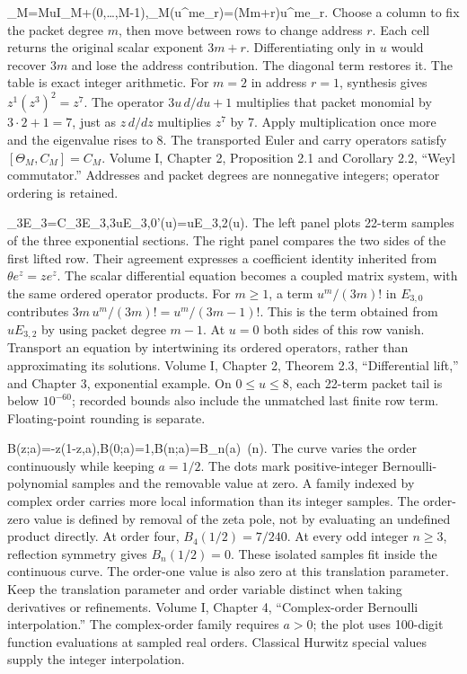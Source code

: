 {\Theta_M=MuI_M+(0,\ldots,M-1),\qquad \Theta_M(u^me_r)=(Mm+r)u^me_r.}
{Choose a column to fix the packet degree $m$, then move between rows to change address $r$. Each cell returns the original scalar exponent $3m+r$. Differentiating only in $u$ would recover $3m$ and lose the address contribution. The diagonal term restores it. The table is exact integer arithmetic.}
{For $m=2$ in address $r=1$, synthesis gives $z^1(z^3)^2=z^7$. The operator $3u\,d/du+1$ multiplies that packet monomial by $3\cdot2+1=7$, just as $z\,d/dz$ multiplies $z^7$ by 7. Apply multiplication once more and the eigenvalue rises to 8.}
{The transported Euler and carry operators satisfy $[\Theta_M,C_M]=C_M$.}
{Volume I, Chapter 2, Proposition 2.1 and Corollary 2.2, ``Weyl commutator.'' Addresses and packet degrees are nonnegative integers; operator ordering is retained.}

{\Theta_3\boldsymbol E_3=C_3\boldsymbol E_3,\qquad 3uE_{3,0}'(u)=uE_{3,2}(u).}
{The left panel plots 22-term samples of the three exponential sections. The right panel compares the two sides of the first lifted row. Their agreement expresses a coefficient identity inherited from $\theta e^z=ze^z$. The scalar differential equation becomes a coupled matrix system, with the same ordered operator products.}
{For $m\ge1$, a term $u^m/(3m)!$ in $E_{3,0}$ contributes $3m\,u^m/(3m)!=u^m/(3m-1)!$. This is the term obtained from $uE_{3,2}$ by using packet degree $m-1$. At $u=0$ both sides of this row vanish.}
{Transport an equation by intertwining its ordered operators, rather than approximating its solutions.}
{Volume I, Chapter 2, Theorem 2.3, ``Differential lift,'' and Chapter 3, exponential example. On $0\le u\le8$, each 22-term packet tail is below $10^{-60}$; recorded bounds also include the unmatched last finite row term. Floating-point rounding is separate.}

{\mathfrak B(z;a)=-z\zeta(1-z,a),\quad \mathfrak B(0;a)=1,\quad \mathfrak B(n;a)=B_n(a)\ (n).}
{The curve varies the order continuously while keeping $a=1/2$. The dots mark positive-integer Bernoulli-polynomial samples and the removable value at zero. A family indexed by complex order carries more local information than its integer samples. The order-zero value is defined by removal of the zeta pole, not by evaluating an undefined product directly.}
{At order four, $B_4(1/2)=7/240$. At every odd integer $n\ge3$, reflection symmetry gives $B_n(1/2)=0$. These isolated samples fit inside the continuous curve. The order-one value is also zero at this translation parameter.}
{Keep the translation parameter and order variable distinct when taking derivatives or refinements.}
{Volume I, Chapter 4, ``Complex-order Bernoulli interpolation.'' The complex-order family requires $a>0$; the plot uses 100-digit function evaluations at sampled real orders. Classical Hurwitz special values supply the integer interpolation.}

